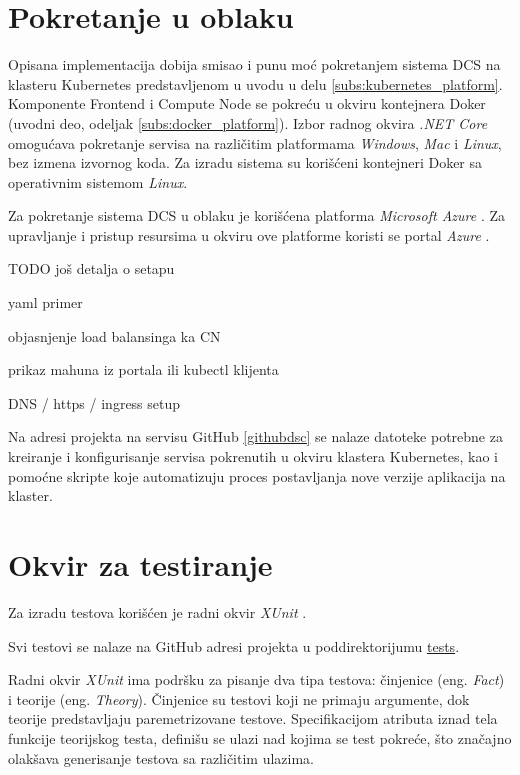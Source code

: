 \documentclass[12pt,oneside]{memoir}
\begin{document}
\section{Pokretanje u oblaku}

Opisana implementacija dobija smisao i punu moć pokretanjem sistema DCS na klasteru Kubernetes predstavljenom u uvodu u delu \ref{subs:kubernetes_platform}. Komponente Frontend i Compute Node se pokreću u okviru kontejnera Doker (uvodni deo, odeljak \ref{subs:docker_platform}). Izbor radnog okvira \emph{.NET Core} omogućava pokretanje servisa na različitim platformama \emph{Windows}, \emph{Mac} i \emph{Linux}, bez izmena izvornog koda. Za izradu sistema su korišćeni kontejneri Doker sa operativnim sistemom \emph{Linux}.

Za pokretanje sistema DCS u oblaku je korišćena platforma \emph{Microsoft Azure} \cite{Azure}. Za upravljanje i pristup resursima u okviru ove platforme koristi se portal \emph{Azure} \cite{AzurePortal}.

TODO još detalja o setapu

yaml primer

objasnjenje load balansinga ka CN

prikaz mahuna iz portala ili kubectl klijenta

DNS / https / ingress setup


Na adresi projekta na servisu GitHub \ref{githubdsc} se nalaze datoteke potrebne za kreiranje i konfigurisanje servisa pokrenutih u okviru klastera Kubernetes, kao i pomoćne skripte koje automatizuju proces postavljanja nove verzije aplikacija na klaster.


\section{Okvir za testiranje}
\label{chp:testiranjesistema}

Za izradu testova korišćen je radni okvir \emph{XUnit} \cite{XUnit}.

Svi testovi se nalaze na GitHub adresi projekta u poddirektorijumu \href{https://github.com/milana-kovacevic/DistributedComputationSystem/tree/main/tests}{tests}.

Radni okvir \emph{XUnit} ima podršku za pisanje dva tipa testova: činjenice (eng. \emph{Fact}) i teorije (eng. \emph{Theory}). Činjenice su testovi koji ne primaju argumente, dok teorije predstavljaju paremetrizovane testove. Specifikacijom atributa iznad tela funkcije teorijskog testa, definišu se ulazi nad kojima se test pokreće, što značajno olakšava generisanje testova sa različitim ulazima.
\end{document}
